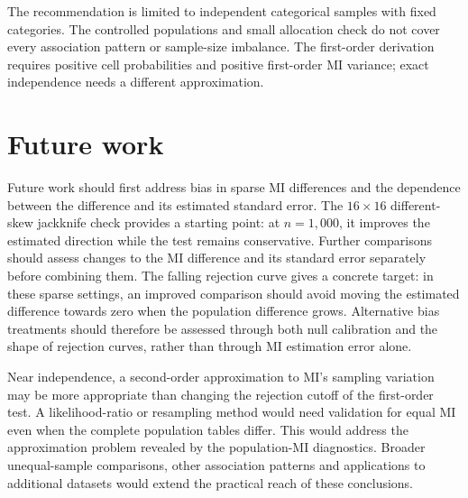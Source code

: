 The recommendation is limited to independent categorical samples with
fixed categories. The controlled populations and small allocation check
do not cover every association pattern or sample-size imbalance.
The first-order derivation requires positive cell probabilities and
positive first-order MI variance; exact independence needs a different
approximation.

\section{Future work}

Future work should first address bias in sparse MI differences and the
dependence between the difference and its estimated standard error.
The \(16\times16\) different-skew jackknife check provides a starting
point: at \(n=1{,}000\), it improves the estimated direction while the
test remains conservative.
Further comparisons should assess changes to the MI difference and its
standard error separately before combining them.
The falling rejection curve gives a concrete target: in these sparse
settings, an improved comparison should avoid moving the estimated
difference towards zero when the population difference grows.
Alternative bias treatments
should therefore be assessed through both null calibration and the
shape of rejection curves, rather than through MI estimation error
alone.

Near independence, a second-order approximation to MI's sampling variation
may be more appropriate than changing the rejection cutoff of the
first-order test. A likelihood-ratio
or resampling method would need validation for equal MI even when the
complete population tables differ. This would address the approximation
problem revealed by the population-MI diagnostics. Broader unequal-sample
comparisons, other association
patterns and applications to additional datasets would extend the practical reach
of these conclusions.
